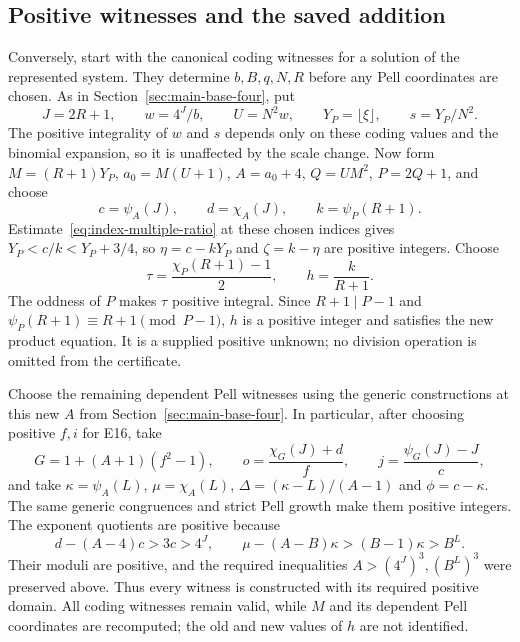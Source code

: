 \subsection{Positive witnesses and the saved addition}

Conversely, start with the canonical coding witnesses for a solution
of the represented system. They determine $b,B,q,N,R$ before any Pell
coordinates are chosen. As in Section~\ref{sec:main-base-four}, put
\[
 J=2R+1,\qquad w=4^J/b,\qquad U=N^2w,
 \qquad Y_P=\lfloor\xi\rfloor,\qquad s=Y_P/N^2.
\]
The positive integrality of $w$ and $s$ depends only on these coding
values and the binomial expansion, so it is unaffected by the scale
change. Now form $M=(R+1)Y_P$, $a_0=M(U+1)$, $A=a_0+4$,
$Q=UM^2$, $P=2Q+1$, and choose
\[
 c=\psi_A(J),\qquad d=\chi_A(J),\qquad k=\psi_P(R+1).
\]
Estimate~\eqref{eq:index-multiple-ratio} at these chosen indices
gives $Y_P<c/k<Y_P+3/4$, so
$\eta=c-kY_P$ and $\zeta=k-\eta$ are positive integers.
Choose
\[
 \tau=\frac{\chi_P(R+1)-1}{2},\qquad h=\frac{k}{R+1}.
\]
The oddness of $P$ makes $\tau$ positive integral. Since
$R+1\mid P-1$ and $\psi_P(R+1)\equiv R+1\pmod{P-1}$,
$h$ is a positive integer and satisfies the new product equation.
It is a supplied positive unknown; no division operation is omitted
from the certificate.

Choose the remaining dependent Pell witnesses using the generic
constructions at this new $A$ from Section~\ref{sec:main-base-four}.
In particular, after choosing positive $f,i$ for E16, take
\[
 G=1+(A+1)(f^2-1),\qquad
 o=\frac{\chi_G(J)+d}{f},\qquad
 j=\frac{\psi_G(J)-J}{c},
\]
and take $\kappa=\psi_A(L)$, $\mu=\chi_A(L)$,
$\Delta=(\kappa-L)/(A-1)$ and $\phi=c-\kappa$.
The same generic congruences and strict Pell growth make them positive
integers. The exponent quotients are positive because
\[
 d-(A-4)c>3c>4^J,\qquad
 \mu-(A-B)\kappa>(B-1)\kappa>B^L.
\]
Their moduli are positive, and the required inequalities
$A>(4^J)^3,(B^L)^3$ were preserved above. Thus every witness is
constructed with its required positive domain. All coding witnesses
remain valid, while $M$ and its dependent Pell coordinates are
recomputed; the old and new values of $h$ are not identified.

